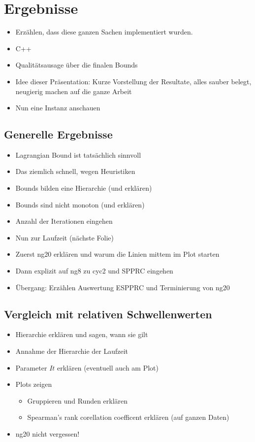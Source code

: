 \documentclass{article}
\begin{document}
\section*{Ergebnisse}
\begin{itemize}
    \item Erzählen, dass diese ganzen Sachen implementiert wurden.
    \item C++
    \item Qualitätsausage über die finalen Bounds
    \item Idee dieser Präsentation: Kurze Vorstellung der Resultate, alles sauber belegt, neugierig machen auf die ganze Arbeit
    \item Nun eine Instanz anschauen
\end{itemize}
\subsection*{Generelle Ergebnisse}
\begin{itemize}
    \item Lagrangian Bound ist tatsächlich sinnvoll
    \item Das ziemlich schnell, wegen Heuristiken
    \item Bounds bilden eine Hierarchie (und erklären)
    \item Bounds sind nicht monoton (und erklären)
    \item Anzahl der Iterationen eingehen
    \item Nun zur Laufzeit (nächste Folie)
    \item Zuerst ng20 erklären und warum die Linien mittem im Plot starten
    \item Dann explizit auf ng8 zu cyc2 und SPPRC eingehen
    \item Übergang: Erzählen Auswertung ESPPRC und Terminierung von ng20
\end{itemize}
\subsection*{Vergleich mit relativen Schwellenwerten}
\begin{itemize}
    \item Hierarchie erklären und sagen, wann sie gilt
    \item Annahme der Hierarchie der Laufzeit
    \item Parameter $It$ erklären (eventuell auch am Plot)
    \item Plots zeigen
    \begin{itemize}
        \item Gruppieren und Runden erklären
        \item Spearman's rank corellation coefficent erklären (auf ganzen Daten)
    \end{itemize}
    \item ng20 nicht vergessen!
\end{itemize}
\end{document}

